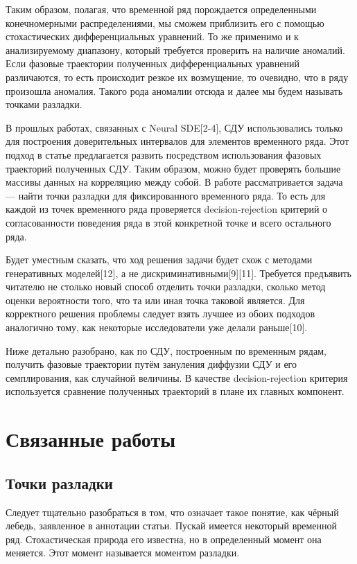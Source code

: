 \documentclass{article}
\begin{document}
   \par Таким образом, полагая, что временной ряд порождается определенными конечномерными распределениями, мы сможем приблизить его с помощью стохастических дифференциальных уравнений. То же применимо и к анализируемому диапазону, который требуется проверить на наличие аномалий. Если фазовые траектории полученных дифференциальных уравнений различаются, то есть происходит резкое их возмущение, то очевидно, что в ряду произошла аномалия. Такого рода аномалии отсюда и далее мы будем называть точками разладки.
   \par В прошлых работах, связанных с Neural SDE[2-4], СДУ использовались только для построения доверительных интервалов для элементов временного ряда. Этот подход в статье предлагается развить посредством использования фазовых траекторий полученных СДУ. Таким образом, можно будет проверять большие массивы данных на корреляцию между собой. В работе рассматривается задача --- найти точки разладки для фиксированного временного ряда. То есть для каждой из точек временного ряда проверяется decision-rejection критерий о согласованности поведения ряда в этой конкретной точке и всего остального ряда.
   \par Будет уместным сказать, что ход решения задачи будет схож с методами генеративных моделей[12], а не дискриминативными[9][11]. Требуется предъявить читателю не столько новый способ отделить точки разладки, сколько метод оценки вероятности того, что та или иная точка таковой является. Для корректного решения проблемы следует взять лучшее из обоих подходов аналогично тому, как некоторые исследователи уже делали раньше[10].
   \par Ниже детально разобрано, как по СДУ, построенным по временным рядам, получить фазовые траектории путём зануления диффузии СДУ и его семплирования, как случайной величины. В качестве decision-rejection критерия используется сравнение полученных траекторий в плане их главных компонент.

\section{Связанные работы}
  \subsection{Точки разладки}
    \par Следует тщательно разобраться в том, что означает такое понятие, как чёрный лебедь, заявленное в аннотации статьи. Пускай имеется некоторый временной ряд. Стохастическая природа его известна, но в определенный момент она меняется. Этот момент называется моментом разладки.
\end{document}
